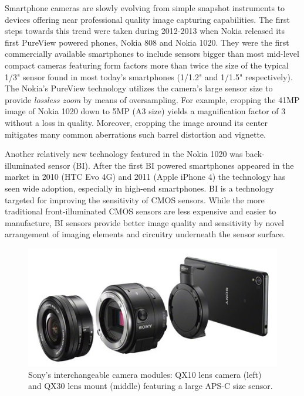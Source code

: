 \documentclass[thesis.tex]{subfiles}
\begin{document}
Smartphone cameras are slowly evolving from simple snapshot instruments to devices offering near professional quality image capturing capabilities. The first steps towards this trend were taken during 2012-2013 when Nokia released its first PureView powered phones, Nokia 808 and Nokia 1020. They were the first commercially available smartphones to include sensors bigger than most mid-level compact cameras featuring form factors more than twice the size of the typical 1/3" sensor found in most today's smartphones (1/1.2" and 1/1.5" respectively). The Nokia's PureView technology utilizes the camera's large sensor size to provide \textit{lossless zoom} by means of oversampling. For example, cropping the 41MP image of Nokia 1020 down to 5MP (A3 size) yields a magnification factor of 3 without a loss in quality. Moreover, cropping the image around its center mitigates many common aberrations such barrel distortion and vignette. \cite{lumia_1020}

Another relatively new technology featured in the Nokia 1020 was back-illuminated sensor (BI). After the first BI powered smartphones appeared in the market in 2010 (HTC Evo 4G) and 2011 (Apple iPhone 4) the technology has seen wide adoption, especially in high-end smartphones. BI is a technology targeted for improving the sensitivity of CMOS sensors. While the more traditional front-illuminated CMOS sensors are less expensive and easier to manufacture, BI sensors provide better image quality and sensitivity by novel arrangement of imaging elements and circuitry underneath the sensor surface.

\begin{figure}[h]
\centering \includegraphics[width=\textwidth]{images/sony_qx.jpg}
\caption{Sony's interchangeable camera modules: QX10 lens camera (left) and QX30 lens mount (middle) featuring a large APS-C size sensor.\label{figure:sony-qx}}
\end{figure}
\end{document}
